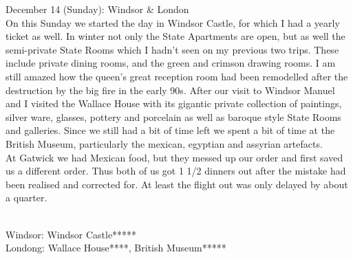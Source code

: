 December 14 (Sunday): Windsor \& London\\
On this Sunday we started the day in Windsor Castle, for which I had a yearly ticket as well. In winter not only the State Apartments are open, but as well the semi-private State Rooms which I hadn't seen on my previous two trips. These include private dining rooms, and the green and crimson drawing rooms. I am still amazed how the queen's great reception room had been remodelled after the destruction by the big fire in the early 90s. After our visit to Windsor Manuel and I visited the Wallace House with its gigantic private collection of paintings, silver ware, glasses, pottery and porcelain as well as baroque style State Rooms and galleries. Since we still had a bit of time left we spent a bit of time at the British Museum, particularly the mexican, egyptian and assyrian artefacts.\\
At Gatwick we had Mexican food, but they messed up our order and first saved us a different order. Thus both of us got 1 1/2 dinners out after the mistake had been realised and corrected for. At least the flight out was only delayed by about a quarter.\\\

Windsor: Windsor Castle*****\\
Londong: Wallace House****, British Museum*****